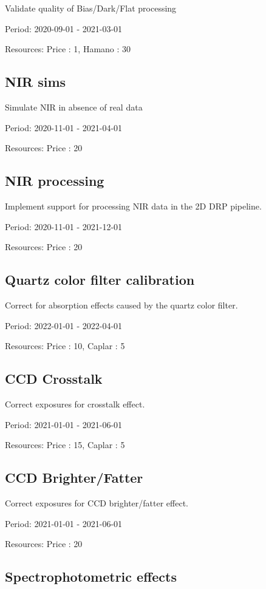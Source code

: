Validate quality of Bias/Dark/Flat processing

Period: 2020-09-01 - 2021-03-01

Resources: Price : 1, Hamano : 30

\subsection{NIR sims}

Simulate NIR in absence of real data

Period: 2020-11-01 - 2021-04-01

Resources: Price : 20

\subsection{NIR processing}

Implement support for processing NIR data in the 2D DRP pipeline.

Period: 2020-11-01 - 2021-12-01

Resources: Price : 20

\subsection{Quartz color filter calibration}

Correct for absorption effects caused by the quartz color filter.

Period: 2022-01-01 - 2022-04-01

Resources: Price : 10, Caplar : 5

\subsection{CCD Crosstalk}

Correct exposures for crosstalk effect.

Period: 2021-01-01 - 2021-06-01

Resources: Price : 15, Caplar : 5

\subsection{CCD Brighter/Fatter}

Correct exposures for CCD brighter/fatter effect.

Period: 2021-01-01 - 2021-06-01

Resources: Price : 20

\subsection{Spectrophotometric effects}

